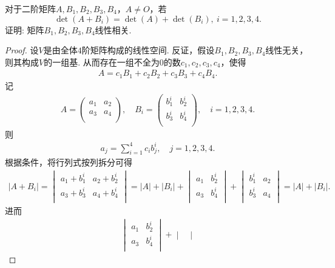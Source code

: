 \documentclass[../../main.tex]{subfiles}%
\begin{document}
\begin{example}
对于二阶矩阵$A,B_1,B_2,B_3,B_4$，$A \neq O$，若
$$\det(A + B_i) = \det(A) + \det(B_i),\ i = 1,2,3,4.$$
证明: 矩阵$B_1,B_2,B_3,B_4$线性相关.
\end{example}
\begin{proof}

设$V$是由全体$4$阶矩阵构成的线性空间. 反证，假设$B_1,B_2,B_3,B_4$线性无关，则其构成$V$的一组基. 从而存在一组不全为$0$的数$c_1,c_2,c_3,c_4$，使得
\begin{align*}
A=c_1B_1+c_2B_2+c_3B_3+c_4B_4.
\end{align*}
记
\begin{align*}
A=\begin{pmatrix}
a_1&		a_2\\
a_3&		a_4\\
\end{pmatrix},\quad B_i=\begin{pmatrix}
b_{1}^{i}&		b_{2}^{i}\\
b_{3}^{i}&		b_{4}^{i}\\
\end{pmatrix},\quad i=1,2,3,4.
\end{align*}
则
\begin{align*}
a_j=\sum_{i=1}^4{c_ib_{j}^{i}},\quad j=1,2,3,4.
\end{align*}
根据条件，将行列式按列拆分可得
\begin{align*}
\left| A+B_i \right|=\begin{vmatrix}
a_1+b_{1}^{i}&		a_2+b_{2}^{i}\\
a_3+b_{3}^{i}&		a_4+b_{4}^{i}\\
\end{vmatrix}=\left| A \right|+\left| B_i \right|+\begin{vmatrix}
a_1&		b_{2}^{i}\\
a_3&		b_{4}^{i}\\
\end{vmatrix}+\begin{vmatrix}
b_{1}^{i}&		a_2\\
b_{3}^{i}&		a_4\\
\end{vmatrix}=\left| A \right|+\left| B_i \right|.
\end{align*}
进而
\begin{align*}
\begin{vmatrix}
a_1&		b_{2}^{i}\\
a_3&		b_{4}^{i}\\
\end{vmatrix}+\begin{vmatrix}

\end{vmatrix}
\end{align*}
\end{proof}
\end{document}
